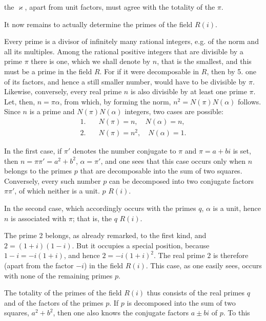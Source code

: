 the $\varkappa$, apart from unit factors, must agree with the totality
of the $\pi$.

It now remains to actually determine the primes of the
field $R(i)$.

Every prime is a divisor of infinitely many rational
integers, e.g. of the norm and all its multiples.
Among the rational positive integers that are divisible by a prime
$\pi$ there is one, which we shall denote by $n$,
that is the smallest, and this must be a prime in the field $R$.
For if it were decomposable in $R$, then by 5. one of its factors,
and hence a still smaller number, would have to be divisible by $\pi$. Likewise,
conversely, every real prime $n$ is also divisible by at least one
prime $\pi$. Let, then, $n = \pi\alpha$, from which, by forming
the norm, $n^2 = N(\pi)N(\alpha)$ follows. Since $n$ is a prime and
$N(\pi)N(\alpha)$ integers, two cases are possible:
\[
\begin{aligned}
1.\quad & N(\pi) = n, \quad N(\alpha) = n,\\
2.\quad & N(\pi) = n^2, \quad N(\alpha) = 1.
\end{aligned}
\]

In the first case, if $\pi'$ denotes the number conjugate to $\pi$
and $\pi = a+bi$ is set, then $n = \pi\pi' = a^2+b^2$,
$\alpha = \pi'$, and one sees that this case occurs only when
$n$ belongs to the primes $p$ that are decomposable into the sum of two
squares. Conversely, every such number $p$
can be decomposed into two conjugate factors $\pi\pi'$, of which neither
is a unit.  $p$ 
$R(i)$.

In the second case, which accordingly occurs with the primes $q$,
$\alpha$ is a unit, hence $n$ is associated with $\pi$; that is, the  $q$  $R(i)$.

The prime 2 belongs, as already remarked, to the first
kind, and $2 = (1+i)(1-i)$. But it occupies a special
position, because $1-i = -i(1+i)$, and hence $2 = -i(1+i)^2$.
The real prime 2 is therefore (apart from the factor $-i$)
 in the field $R(i)$. This
case, as one easily sees, occurs with none of the remaining
primes $p$.

The totality of the primes of the field $R(i)$ thus consists
of the real primes $q$ and of the factors of the primes
$p$. If $p$ is decomposed into the sum of two squares, $a^2+b^2$, then
one also knows the conjugate factors $a\pm bi$ of $p$. To this
